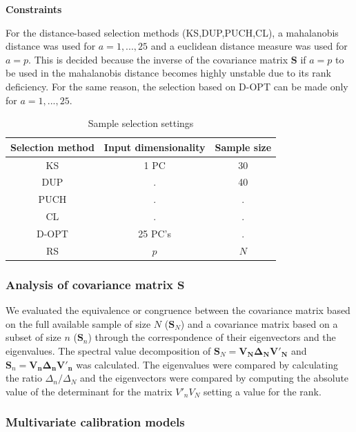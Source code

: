 \documentclass[journal=ancham,manuscript=article]{achemso}
\begin{document}
\textbf{Constraints}

For the distance-based selection methods (KS,DUP,PUCH,CL), a mahalanobis distance was used for $a=1,...,25$ and a euclidean distance measure was used for $a=p$. This is decided because the inverse of the covariance matrix $\mathbf{S}$ if $a=p$ to be used in the mahalanobis distance becomes highly unstable due to its rank deficiency. For the same reason, the selection based on D-OPT can be made only for $a=1,...,25$. 

\begin{table}[t]
\centering
\begin{tabular}{|c|c|c|} 
\hline
Selection method	& Input dimensionality	& Sample size	\\
\hline

KS & 1 PC   & 30  \\
DUP &  . & 40\\
PUCH &  . & . \\
CL & . & . \\
D-OPT & 25 PC's & .\\
RS & $p$ & $N$\\
\hline


\end{tabular}
\caption{Sample selection settings}
\label{tab_samplesel_settings_exhaustive_search}
\end{table}

\subsubsection*{Analysis of covariance matrix $\mathbf{S}$}

We evaluated the equivalence or congruence between the covariance matrix based on the full available sample of size $N$ ($\mathbf{S}_N$) and a covariance matrix based on a subset of size $n$ ($\mathbf{S}_n$) through the correspondence of their eigenvectors and the eigenvalues. The spectral value decomposition of $\mathbf{S}_N = \mathbf{V_N \Delta_N V'_N}$ and $\mathbf{S}_n = \mathbf{V_n \Delta_n V'_n}$ was calculated. The eigenvalues were compared by calculating the ratio  $\Delta_n/\Delta_N$ and the eigenvectors were compared by computing the absolute value of the determinant for the matrix $V'_nV_N$ setting a value for the rank.

\subsubsection*{Multivariate calibration models}
\end{document}
